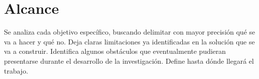 \section{Alcance}
Se analiza cada objetivo específico, buscando delimitar con mayor precisión qué se va a hacer y qué no.
Deja claras limitaciones ya identificadas en la solución que se va a construir.
Identifica algunos obstáculos que eventualmente pudieran presentarse durante el desarrollo de la investigación.
Define hasta dónde llegará el trabajo.
